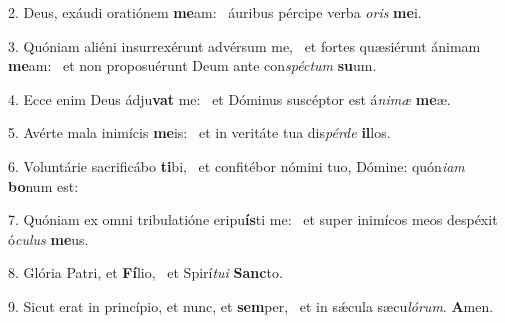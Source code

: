 2. Deus, exáudi oratiónem \textbf{me}am: \ast\  áuribus pércipe verba \textit{o}\textit{ris} \textbf{me}i.\

3. Quóniam aliéni insurrexérunt advérsum me, \dag\  et fortes quæsiérunt ánimam \textbf{me}am: \ast\  et non proposuérunt Deum ante con\textit{spéc}\textit{tum} \textbf{su}um.\

4. Ecce enim Deus ádju\textbf{vat} me: \ast\  et Dóminus suscéptor est á\textit{ni}\textit{mæ} \textbf{me}æ.\

5. Avérte mala inimícis \textbf{me}is: \ast\  et in veritáte tua dis\textit{pér}\textit{de} \textbf{il}los.\

6. Voluntárie sacrificábo \textbf{ti}bi, \ast\  et confitébor nómini tuo, Dómine: quón\textit{i}\textit{am} \textbf{bo}num est:\

7. Quóniam ex omni tribulatióne eripu\textbf{ís}ti me: \ast\  et super inimícos meos despéxit ó\textit{cu}\textit{lus} \textbf{me}us.\

8. Glória Patri, et \textbf{Fí}lio, \ast\  et Spirí\textit{tu}\textit{i} \textbf{Sanc}to.\

9. Sicut erat in princípio, et nunc, et \textbf{sem}per, \ast\  et in sǽcula sæcu\textit{ló}\textit{rum}. \textbf{A}men.\

